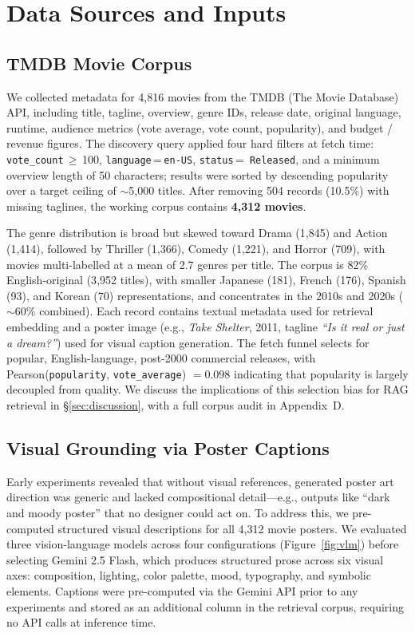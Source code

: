 \documentclass[10pt,twocolumn]{article}
\begin{document}
\section{Data Sources and Inputs}
\label{sec:data}

\subsection{TMDB Movie Corpus}
\label{sec:corpus}

We collected metadata for 4{,}816 movies from the TMDB
(The Movie Database) API, including title, tagline, overview,
genre IDs, release date, original language, runtime, audience
metrics (vote average, vote count, popularity), and budget /
revenue figures. The discovery query applied four hard filters
at fetch time: \texttt{vote\_count}\,$\geq$\,100,
\texttt{language}\,=\,\texttt{en-US}, \texttt{status}\,=\,
\texttt{Released}, and a minimum overview length of 50
characters; results were sorted by descending popularity over a
target ceiling of $\sim$5{,}000 titles. After removing 504
records (10.5\%) with missing taglines, the working corpus
contains \textbf{4{,}312 movies}.

The genre distribution is broad but skewed toward Drama (1{,}845)
and Action (1{,}414), followed by Thriller (1{,}366), Comedy
(1{,}221), and Horror (709), with movies multi-labelled at a
mean of 2.7 genres per title. The corpus is 82\% English-original
(3{,}952 titles), with smaller Japanese (181), French (176),
Spanish (93), and Korean (70) representations, and concentrates
in the 2010s and 2020s ($\sim$60\% combined). Each record
contains textual metadata used for retrieval embedding and a
poster image (e.g., \textit{Take Shelter}, 2011, tagline
\textit{``Is it real or just a dream?''}) used for visual
caption generation. The fetch funnel selects for popular,
English-language, post-2000 commercial releases, with
Pearson(\texttt{popularity}, \texttt{vote\_average}) $= 0.098$
indicating that popularity is largely decoupled from quality.
We discuss the implications of this selection bias for RAG
retrieval in \S\ref{sec:discussion}, with a full corpus audit
in Appendix~D.

\subsection{Visual Grounding via Poster Captions}
\label{sec:posters}

Early experiments revealed that without visual references,
generated poster art direction was generic and lacked
compositional detail---e.g., outputs like ``dark and moody
poster'' that no designer could act on. To address this, we
pre-computed structured visual descriptions for all 4{,}312
movie posters. We evaluated three vision-language models across
four configurations (Figure~\ref{fig:vlm}) before selecting
Gemini 2.5 Flash, which produces structured prose across six
visual axes: composition, lighting, color palette, mood,
typography, and symbolic elements. Captions were pre-computed
via the Gemini API prior to any experiments and stored as an
additional column in the retrieval corpus, requiring no API
calls at inference time.
\end{document}
